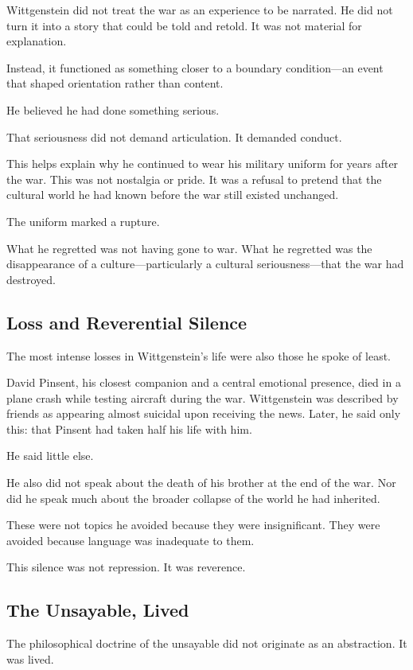 \documentclass[11pt]{article}
\begin{document}
Wittgenstein did not treat the war as an experience to be narrated. He did not turn it into a story that could be told and retold. It was not material for explanation.

Instead, it functioned as something closer to a boundary condition—an event that shaped orientation rather than content.

He believed he had done something serious.

That seriousness did not demand articulation. It demanded conduct.

This helps explain why he continued to wear his military uniform for years after the war. This was not nostalgia or pride. It was a refusal to pretend that the cultural world he had known before the war still existed unchanged.

The uniform marked a rupture.

What he regretted was not having gone to war. What he regretted was the disappearance of a culture—particularly a cultural seriousness—that the war had destroyed.

\subsection*{Loss and Reverential Silence}

The most intense losses in Wittgenstein’s life were also those he spoke of least.

David Pinsent, his closest companion and a central emotional presence, died in a plane crash while testing aircraft during the war. Wittgenstein was described by friends as appearing almost suicidal upon receiving the news. Later, he said only this: that Pinsent had taken half his life with him.

He said little else.

He also did not speak about the death of his brother at the end of the war. Nor did he speak much about the broader collapse of the world he had inherited.

These were not topics he avoided because they were insignificant. They were avoided because language was inadequate to them.

This silence was not repression. It was reverence.

\subsection*{The Unsayable, Lived}

The philosophical doctrine of the unsayable did not originate as an abstraction. It was lived.
\end{document}
